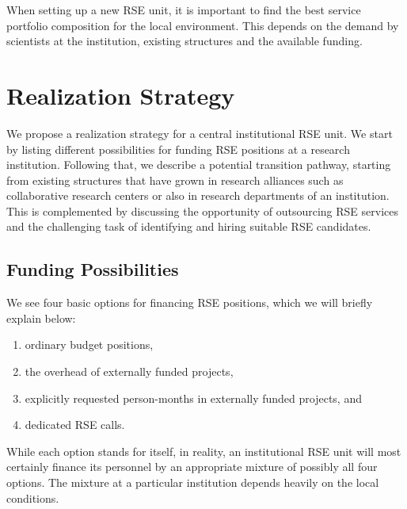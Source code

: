 \documentclass[a4paper]{article}
\begin{document}
When setting up a new RSE unit, it is important to find the best service portfolio composition for the local environment.
This depends on the demand by scientists at the institution, existing structures and the available funding.

\section{Realization Strategy}%
\label{sec:realization}

We propose a realization strategy for a central institutional RSE unit.
We start by listing different possibilities for funding RSE positions at a research institution.
Following that, we describe a potential transition pathway, starting from existing structures that have grown in research alliances such as collaborative research centers or also in research departments of an institution.
This is complemented by discussing the opportunity of outsourcing RSE services and the challenging task of identifying and hiring suitable RSE candidates.

\subsection{Funding Possibilities}%
\label{sec:funding}

We see four basic options for financing RSE positions, which we will briefly explain below:
\begin{enumerate}
\item ordinary budget positions,
\item the overhead of externally funded projects,
\item explicitly requested person-months in externally funded projects, and
\item dedicated RSE calls.
\end{enumerate}
While each option stands for itself, in reality, an institutional RSE unit will most certainly finance its personnel by an appropriate mixture of possibly all four options.
The mixture at a particular institution depends heavily on the local conditions.
\end{document}
